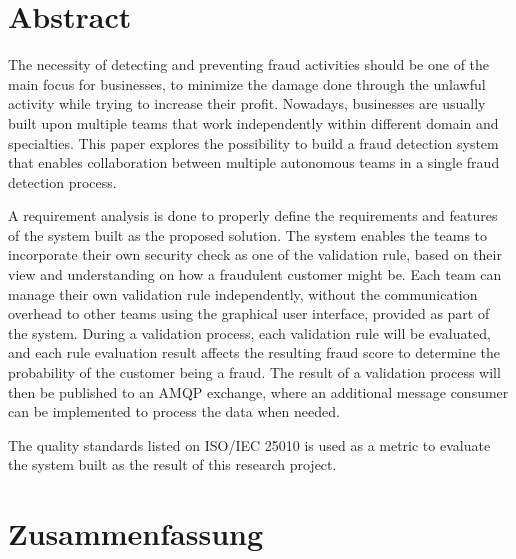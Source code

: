 \newpage
\thispagestyle{empty}       %

\section*{Abstract}


The necessity of detecting and preventing fraud activities should be one of the main focus for businesses, to minimize the damage done through the unlawful activity while trying to increase their profit. Nowadays, businesses are usually built upon multiple teams that work independently within different domain and specialties. This paper explores the possibility to build a fraud detection system that enables collaboration between multiple autonomous teams in a single fraud detection process. 

A requirement analysis is done to properly define the requirements and features of the system built as the proposed solution. The system enables the teams to incorporate their own security check as one of the validation rule, based on their view and understanding on how a fraudulent customer might be. Each team can manage their own validation rule independently, without the communication overhead to other teams using the graphical user interface, provided as part of the system. During a validation process, each validation rule will be evaluated, and each rule evaluation result affects the resulting fraud score to determine the probability of the customer being a fraud. The result of a validation process will then be published to an AMQP exchange, where an additional message consumer can be implemented to process the data when needed.

The quality standards listed on ISO/IEC 25010 is used as a metric to evaluate the system built as the result of this research project. 

\newpage
\thispagestyle{empty}
\section*{Zusammenfassung}

